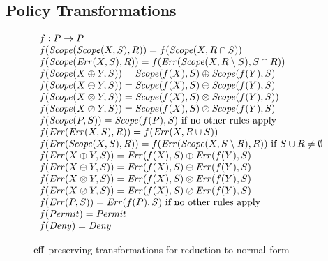 \subsection{Policy Transformations}
\label{sec:transformations}

\begin{figure}[t]
\centering
\begin{footnotesize}
\[
\begin{array}{l}
  f : P   \rightarrow  P \nonumber \\
  f (\text{\textit{Scope}} (\text{\textit{Scope}} (X, S), R))  =  f (\text{\textit{Scope}} (X, R \cap S)) 
  \nonumber \\
  f (\text{\textit{Scope}} (\text{\textit{Err}} (X, S), R))  =  f (\text{\textit{Err}} (\text{\textit{Scope}} (X, R \setminus S), S \cap R)) 
  \nonumber \\
  f (\text{\textit{Scope}} (X \oplus Y, S))  =  \text{\textit{Scope}} (f (X), S) \oplus \text{\textit{Scope}} (f (Y), S) 
  \nonumber \\
  f (\text{\textit{Scope}} (X \ominus Y, S))  =  \text{\textit{Scope}} (f (X), S) \ominus \text{\textit{Scope}} (f (Y), S) 
  \nonumber \\
  f (\text{\textit{Scope}} (X \otimes Y, S))  =  \text{\textit{Scope}} (f (X), S) \otimes \text{\textit{Scope}} (f (Y), S)) 
  \nonumber \\
  f (\text{\textit{Scope}} (X \oslash Y, S))  =  \text{\textit{Scope}} (f (X), S) \oslash \text{\textit{Scope}} (f (Y), S) 
  \nonumber \\
  f (\text{\textit{Scope}} (P, S))  =  \text{\textit{Scope}} (f (P), S) 
     \ \text{if no other rules apply} \nonumber \\
  f (\text{\textit{Err}} (\text{\textit{Err}} (X, S), R))  =  f (\text{\textit{Err}} (X, R \cup S)) \nonumber \\
  f (\text{\textit{Err}} (\text{\textit{Scope}} (X, S), R))  =  f (\text{\textit{Err}} (\text{\textit{Scope}} (X, S \setminus R), R)) 
     \ \text{if $S \cup R \neq \emptyset$} \nonumber \\
  f (\text{\textit{Err}} (X \oplus Y, S))   =   \text{\textit{Err}} (f (X), S) \oplus \text{\textit{Err}} (f (Y), S) \nonumber \\
  f (\text{\textit{Err}} (X \ominus Y, S))  =   \text{\textit{Err}} (f (X), S) \ominus \text{\textit{Err}} (f (Y), S) \nonumber \\
  f (\text{\textit{Err}} (X \otimes Y, S))  =   \text{\textit{Err}} (f (X), S) \otimes \text{\textit{Err}} (f (Y), S) \nonumber \\
  f (\text{\textit{Err}} (X \oslash Y, S))  =   \text{\textit{Err}} (f (X), S) \oslash \text{\textit{Err}} (f (Y), S) \nonumber \\
  f (\text{\textit{Err}} (P, S))  =  \text{\textit{Err}} (f (P), S) 
     \  \text{if no other rules apply} \nonumber \\
  f (\text{\textit{Permit}})  =  \text{\textit{Permit}} \nonumber \\
  f (\text{\textit{Deny}})  =  \text{\textit{Deny}} \nonumber
\end{array}
\]
\end{footnotesize}
\caption{$\operatorname{eff}$-preserving transformations for reduction to normal form}
\label{fig:1streduction}
\end{figure}

